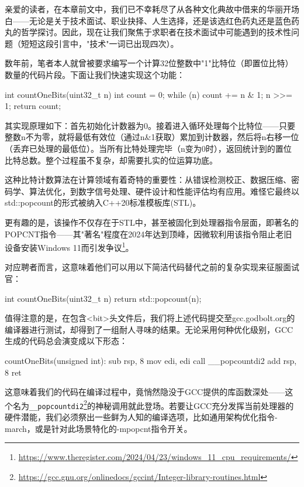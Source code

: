 亲爱的读者，在本章前文中，我们已不幸耗尽了从各种文化典故中借来的华丽开场白——无论是关于技术面试、职业抉择、人生选择，还是该选红色药丸还是蓝色药丸的哲学探讨。因此，现在让我们聚焦于求职者在技术面试中可能遇到的技术性问题（短短这段引言中，"技术"一词已出现四次）。

数年前，笔者本人就曾被要求编写一个计算32位整数中"1"比特位（即置位比特）数量的代码片段。下面让我们快速实现这个功能：

\begin{cpp}
int countOneBits(uint32_t n) {
  int count = 0;
  while (n) {
    count += n & 1;
    n >>= 1;
  }
  return count;
}
\end{cpp}

其实现原理如下：首先初始化计数器为0。接着进入循环处理每个比特位——只要整数n不为零，就将最低有效位（通过n\&1获取）累加到计数器，然后将n右移一位（丢弃已处理的最低位）。当所有比特处理完毕（n变为0时），返回统计到的置位比特总数。整个过程虽不复杂，却需要扎实的位运算功底。

这种比特计数算法在计算领域有着奇特的重要性：从错误检测校正、数据压缩、密码学、算法优化，到数字信号处理、硬件设计和性能评估均有应用。难怪它最终以std::popcount的形式被纳入C++20标准模板库(STL)。

更有趣的是，该操作不仅存在于STL中，甚至被固化到处理器指令层面，即著名的POPCNT指令——其"著名"程度在2024年达到顶峰，因微软利用该指令阻止老旧设备安装Windows 11而引发争议\footnote{\url{https://www.theregister.com/2024/04/23/windows_11_cpu_requirements/}}。

对应聘者而言，这意味着他们可以用以下简洁代码替代之前的复杂实现来征服面试官：

\begin{cpp}
int countOneBits(uint32_t n) {
  return std::popcount(n);
}
\end{cpp}

值得注意的是，在包含<bit>头文件后，我们将上述代码提交至gcc.godbolt.org的编译器进行测试，却得到了一组耐人寻味的结果。无论采用何种优化级别，GCC生成的代码总会演变成以下形态：

\begin{shell}
countOneBits(unsigned int):
  sub rsp, 8
  mov edi, edi
  call __popcountdi2
  add rsp, 8
  ret
\end{shell}

这意味着我们的代码在编译过程中，竟悄然隐没于GCC提供的库函数深处——这个名为\verb|__popcountdi2|\footnote{\url{https://gcc.gnu.org/onlinedocs/gccint/Integer-library-routines.html}}的神秘调用就此登场。若要让GCC充分发挥当前处理器的硬件潜能，我们必须祭出一些鲜为人知的编译选项，比如通用架构优化指令-march，或是针对此场景特化的-mpopcnt指令开关。


